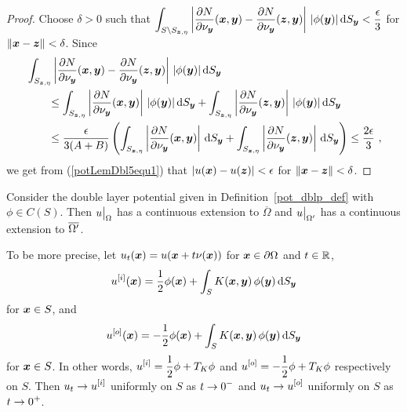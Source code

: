 \begin{proof}
Choose $\delta > 0$ such that
$\displaystyle
\int_{S \setminus S_{{\bm{z}},\eta}} \left| \frac{\partial{N}}{\partial \nu_{{\bm{y}}}}
({\bm{x}},{\bm{y}}) - \frac{\partial{N}}{\partial \nu_{{\bm{y}}}} ({\bm{z}},{\bm{y}})
\right|\,|\phi({\bm{y}})| \,\mathrm{d}{S}_{{\bm{y}}} < \frac{\epsilon}{3}$ for
$\|{\bm{x}} - {\bm{z}}\| < \delta$.
Since
\begin{align*}
&\int_{S_{{\bm{z}},\eta}}
\left| \frac{\partial{N}}{\partial \nu_{{\bm{y}}}} ({\bm{x}},{\bm{y}})
- \frac{\partial{N}}{\partial \nu_{{\bm{y}}}} ({\bm{z}},{\bm{y}}) \right|\,
|\phi({\bm{y}})| \,\mathrm{d}{S}_{{\bm{y}}} \\
& \qquad \leq \int_{S_{{\bm{z}},\eta}}
\left| \frac{\partial{N}}{\partial \nu_{{\bm{y}}}} ({\bm{x}},{\bm{y}}) \right|\,
|\phi({\bm{y}})| \,\mathrm{d}{S}_{{\bm{y}}} 
+ \int_{S_{{\bm{z}},\eta}}
\left| \frac{\partial{N}}{\partial \nu_{{\bm{y}}}} ({\bm{z}},{\bm{y}}) \right|\,
|\phi({\bm{y}})| \,\mathrm{d}{S}_{{\bm{y}}} \\
&\qquad \leq \frac{\epsilon}{3(A+B)} \left(
\int_{S_{{\bm{z}},\eta}}
\left| \frac{\partial{N}}{\partial \nu_{{\bm{y}}}} ({\bm{x}},{\bm{y}}) \right| \,\mathrm{d}{S}_{{\bm{y}}} 
+ \int_{S_{{\bm{z}},\eta}}
\left| \frac{\partial{N}}{\partial \nu_{{\bm{y}}}} ({\bm{z}},{\bm{y}}) \right| \,\mathrm{d}{S}_{{\bm{y}}}
\right)
\leq \frac{2\epsilon}{3} \ ,
\end{align*}
we get from (\ref{potLemDbl5equ1}) that
$|u({\bm{x}}) - u({\bm{z}})| < \epsilon$ for 
$\|{\bm{x}} - {\bm{z}}\| < \delta$.
\end{proof}

\begin{theorem} \label{pot_double_layer}
Consider the double layer potential given in
Definition~\ref{pot_dblp_def} with $\phi \in C(S)$.
Then $\displaystyle u\big|_\Omega$ has a continuous extension to
$\overline{\Omega}$ and $\displaystyle u\big|_{\Omega^{\prime}}$
has a continuous extension to $\displaystyle \overline{\Omega^{\prime}}$.

To be more precise, let
$\displaystyle u_t({\bm{x}}) = u({\bm{x}} + t \nu({\bm{x}}))$
for ${\bm{x}} \in \partial \Omega$ and $t \in \mathbb{R}$,
\begin{equation} \label{pot_dblpT1}
u^{[i]}({\bm{x}}) = \frac{1}{2} \phi({\bm{x}}) + \int_S
K({\bm{x}},{\bm{y}}) \, \phi({\bm{y}}) \,\mathrm{d}{S}_{{\bm{y}}}
\end{equation}
for ${\bm{x}} \in S$, and
\begin{equation} \label{pot_dblpT2}
u^{[o]}({\bm{x}}) = - \frac{1}{2} \phi({\bm{x}}) + \int_S
K({\bm{x}},{\bm{y}}) \, \phi({\bm{y}}) \,\mathrm{d}{S}_{{\bm{y}}}
\end{equation}
for ${\bm{x}} \in S$.
In other words, $\displaystyle u^{[i]} = \frac{1}{2} \phi + T_K \phi$ and
$\displaystyle u^{[o]} = -\frac{1}{2} \phi + T_K \phi$ respectively on $S$.
Then $\displaystyle u_t \rightarrow u^{[i]}$ uniformly on $S$ as
$\displaystyle t\rightarrow 0^-$ and
$\displaystyle u_t \rightarrow u^{[o]}$ uniformly on $S$ as
$\displaystyle t\rightarrow 0^+$.
\end{theorem}

